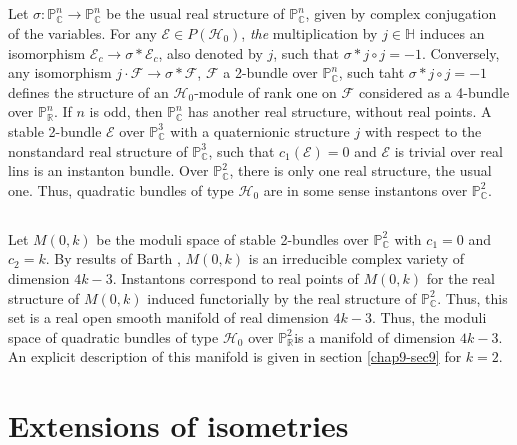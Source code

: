 \setcounter{subsection}{7}
\subsection{}\label{chap9-sec2.8}

Let
$\sigma:\mathbb{P}^{n}_{\mathbb{C}}\to \mathbb{P}^{n}_{\mathbb{C}}$ be
the usual real structure of $\mathbb{P}^{n}_{\mathbb{C}}$, given by
complex conjugation of the variables. For any $\mathscr{E}\in
P(\mathscr{H}_{0})$, {\em the} multiplication by $j\in \mathbb{H}$
induces an isomorphism
$\mathscr{E}_{c}\to \sigma\ast \mathscr{E}_{c}$, also denoted by $j$,
such that $\sigma\ast j\circ j=-1$. Conversely, any isomorphism
$j\cdot \mathscr{F}\to \sigma\ast\mathscr{F}$, $\mathscr{F}$ a
2-bundle over $\mathbb{P}^{n}_{\mathbb{C}}$, such taht $\sigma\ast
j\circ j=-1$ defines the structure of an $\mathscr{H}_{0}$-module of
rank one on $\mathscr{F}$ considered as a 4-bundle over
$\mathbb{P}^{n}_{\mathbb{R}}$. If $n$ is odd, then
$\mathbb{P}^{n}_{\mathbb{C}}$ has another real structure, without real
points. A stable 2-bundle $\mathscr{E}$ over
$\mathbb{P}^{3}_{\mathbb{C}}$ with a quaternionic structure $j$ with
respect to the nonstandard real structure of
$\mathbb{P}^{3}_{\mathbb{C}}$, such that $c_{1}(\mathscr{E})=0$ and
$\mathscr{E}$ is trivial over real lins is an instanton bundle. Over
$\mathbb{P}^{2}_{\mathbb{C}}$, there is only one real structure, the
usual one. Thus, quadratic bundles of type $\mathscr{H}_{0}$ are in
some sense instantons over $\mathbb{P}^{2}_{\mathbb{C}}$. 

\subsection{}\label{chap9-sec2.9}

Let $M(0,k)$ be the moduli space of stable 2-bundles over
$\mathbb{P}^{2}_{\mathbb{C}}$ with $c_{1}=0$ and $c_{2}=k$. By results
of Barth \cite{chap9-key1}, $M(0,k)$ is an irreducible complex variety
of dimension $4k-3$. Instantons correspond to real points of $M(0,k)$
for the real structure of $M(0,k)$ induced functorially by the real
structure of $\mathbb{P}^{2}_{\mathbb{C}}$. Thus, this set is a real
open smooth manifold of real dimension $4k-3$. Thus, the moduli space
of quadratic bundles of type $\mathscr{H}_{0}$ over
$\mathbb{P}^{2}_{\mathbb{R}}$\pageoriginale is a manifold of dimension
$4k-3$. An explicit description of this manifold is given in
section \ref{chap9-sec9} for $k=2$.

\section{Extensions of isometries}\label{chap9-sec3}

